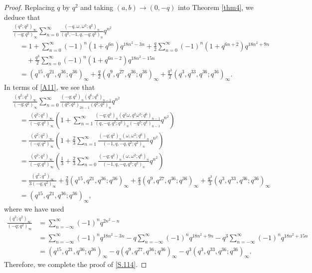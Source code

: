 \documentclass[10pt,a4paper]{amsart}
\begin{document}
\begin{proof}
Replacing $q$ by $q^2$ and taking $\left(a,b\right)\to\left(0,-q\right)$ into Theorem \ref{thm4}, we deduce that
\begin{align}
&\frac{\left(q^2;q^2\right)_{\infty}}{\left(-q;q^2\right)_{\infty}}
\sum_{n=0}^{\infty}\frac{\left(-q,\omega,\omega^2;q^2\right)_n}
{\left(q^2,-1,q,-q;q^2\right)_n}q^{n^2}
\nonumber\\
&\quad=1+\sum_{n=0}^{\infty}\left(-1\right)^n\left(1+q^{6n}\right)q^{18n^2-3n}
+\frac{q}{2}\sum_{n=0}^{\infty}\left(-1\right)^n\left(1+q^{6n+2}\right)q^{18n^2+9n}
\nonumber\\
&\qquad+\frac{q^3}{2}\sum_{n=0}^{\infty}\left(-1\right)^n
\left(1+q^{6n-2}\right)q^{18n^2-15n}\nonumber\\
&\quad=\left(q^{15},q^{21},q^{36};q^{36}\right)_{\infty}
+\frac{q}{2}\left(q^{9},q^{27},q^{36};q^{36}\right)_{\infty}
+\frac{q^3}{2}\left(q^{3},q^{33},q^{36};q^{36}\right)_{\infty}.\label{A11}
\end{align}
In terms of \eqref{A11}, we see that
\begin{align*}
&\frac{\left(q^2;q^2\right)_{\infty}}{\left(-q;q^2\right)_{\infty}}
\sum_{n=0}^{\infty}\frac{\left(-q;q^2\right)_n\left(q^6;q^6\right)_{n-1}}
{\left(q^2;q^2\right)_{2n-1}\left(q^2;q^2\right)_n}q^{n^2}\\
&\quad=
\frac{\left(q^2;q^2\right)_{\infty}}{\left(-q;q^2\right)_{\infty}}
\left(1+\sum_{n=1}^{\infty}\frac{\left(-q;q^2\right)_n
\left(q^2\omega,q^2\omega^2;q^6\right)_{n-1}}
{\left(q,-q,q^2;q^2\right)_{n}\left(-q^2;q^2\right)_{n-1}}q^{n^2}
\right)\\
&\quad=
\frac{\left(q^2;q^2\right)_{\infty}}{\left(-q;q^2\right)_{\infty}}
\left(1+\frac{2}{3}\sum_{n=1}^{\infty}\frac{\left(-q;q^2\right)_n
\left(\omega,\omega^2;q^6\right)_{n}}
{\left(-1,q,-q,q^2;q^2\right)_{n}}q^{n^2}
\right)\\
&\quad=
\frac{\left(q^2;q^2\right)_{\infty}}{\left(-q;q^2\right)_{\infty}}
\left(\frac{1}{3}+\frac{2}{3}\sum_{n=0}^{\infty}\frac{\left(-q;q^2\right)_n
\left(\omega,\omega^2;q^6\right)_{n}}
{\left(-1,q,-q,q^2;q^2\right)_{n}}q^{n^2}
\right)\\
&\quad=\frac{\left(q^2;q^2\right)_{\infty}}{3\left(-q;q^2\right)_{\infty}}
+\frac{2}{3}\left(q^{15},q^{21},q^{36};q^{36}\right)_{\infty}
+\frac{q}{3}\left(q^{9},q^{27},q^{36};q^{36}\right)_{\infty}
+\frac{q^3}{3}\left(q^{3},q^{33},q^{36};q^{36}\right)_{\infty}\\
&\quad=\left(q^{15},q^{21},q^{36};q^{36}\right)_{\infty},
\end{align*}
where we have used
\begin{align*}
\frac{\left(q^2;q^2\right)_{\infty}}{\left(-q;q^2\right)_{\infty}}
&=\sum_{n=-\infty}^{\infty}\left(-1\right)^nq^{2n^2-n}\\
&=\sum_{n=-\infty}^{\infty}\left(-1\right)^nq^{18n^2-3n}
-q\sum_{n=-\infty}^{\infty}\left(-1\right)^nq^{18n^2+9n}
-q^3\sum_{n=-\infty}^{\infty}\left(-1\right)^nq^{18n^2+15n}
\\
&=\left(q^{15},q^{21},q^{36};q^{36}\right)_{\infty}
-q\left(q^{9},q^{27},q^{36};q^{36}\right)_{\infty}
-q^3\left(q^{3},q^{33},q^{36};q^{36}\right)_{\infty}.
\end{align*}
Therefore, we complete the proof of \eqref{S.114}.
\end{proof}
\end{document}
